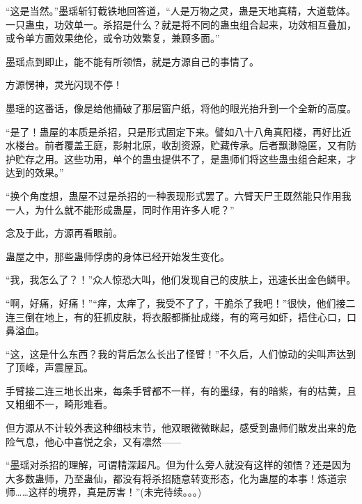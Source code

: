 \begin{this_body}
“这是当然。”墨瑶斩钉截铁地回答道，“人是万物之灵，蛊是天地真精，大道载体。一只蛊虫，功效单一。杀招是什么？就是将不同的蛊虫组合起来，功效相互叠加，或令单方面效果绝伦，或令功效繁复，兼顾多面。”

墨瑶点到即止，能不能有所领悟，就是方源自己的事情了。

方源愣神，灵光闪现不停！

墨瑶的这番话，像是给他捅破了那层窗户纸，将他的眼光抬升到一个全新的高度。

“是了！蛊屋的本质是杀招，只是形式固定下来。譬如八十八角真阳楼，再好比近水楼台。前者覆盖王庭，影射北原，收刮资源，贮藏传承。后者飘渺隐匿，又有防护贮存之用。这些功用，单个的蛊虫提供不了，是蛊师们将这些蛊虫组合起来，才达到的效果。”

“换个角度想，蛊屋不过是杀招的一种表现形式罢了。六臂天尸王既然能只作用我一人，为什么就不能形成蛊屋，同时作用许多人呢？”

念及于此，方源再看眼前。

蛊屋之中，那些蛊师俘虏的身体已经开始发生变化。

“我，我怎么了？！”众人惊恐大叫，他们发现自己的皮肤上，迅速长出金色鳞甲。

“啊，好痛，好痛！”“痒，太痒了，我受不了了，干脆杀了我吧！”很快，他们接二连三倒在地上，有的狂抓皮肤，将衣服都撕扯成缕，有的弯弓如虾，捂住心口，口鼻溢血。

“这，这是什么东西？我的背后怎么长出了怪臂！”不久后，人们惊动的尖叫声达到了顶峰，声震屋瓦。

手臂接二连三地长出来，每条手臂都不一样，有的墨绿，有的暗紫，有的枯黄，且又粗细不一，畸形难看。

但方源从不计较外表这种细枝末节，他双眼微微眯起，感受到蛊师们散发出来的危险气息，他心中喜悦之余，又有凛然——

“墨瑶对杀招的理解，可谓精深超凡。但为什么旁人就没有这样的领悟？还是因为大多数蛊师，乃至蛊仙，都没有将杀招随意转变形态，化为蛊屋的本事！炼道宗师……这样的境界，真是厉害！”(未完待续。。。)

\end{this_body}

